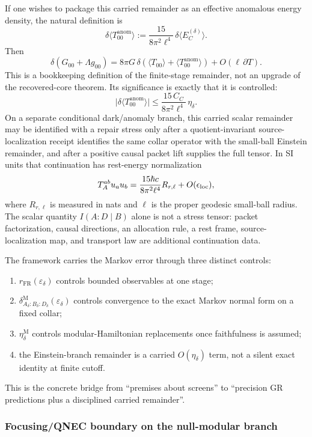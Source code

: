If one wishes to package this carried remainder as an effective anomalous energy density, the natural definition is
\[
\delta\langle T_{00}^{\mathrm{anom}}\rangle
:=
\frac{15}{8\pi^2\ell^4}\,
\delta\langle E_C^{(\delta)}\rangle.
\]
Then
\[
\delta\!\left(G_{00}+\Lambda g_{00}\right)
=
8\pi G\,
\delta\!\left(
\langle T_{00}\rangle
+
\langle T_{00}^{\mathrm{anom}}\rangle
\right)
+
O(\ell\,\partial T).
\]
This is a bookkeeping definition of the finite-stage remainder, not an upgrade of the recovered-core theorem. Its significance is exactly that it is controlled:
\[
\bigl|
\delta\langle T_{00}^{\mathrm{anom}}\rangle
\bigr|
\le
\frac{15\,C_C}{8\pi^2\ell^4}\,
\eta_\delta.
\]
On a separate conditional dark/anomaly branch, this carried scalar remainder
may be identified with a repair stress only after a quotient-invariant
source-localization receipt identifies the same collar operator with the
small-ball Einstein remainder, and after a positive causal packet lift supplies
the full tensor. In SI units that continuation has rest-energy normalization
\[
T_A^{ab}u_a u_b
=
\frac{15\hbar c}{8\pi^2\ell^4}R_{r,\ell}
+O(\epsilon_{\rm loc}),
\]
where \(R_{r,\ell}\) is measured in nats and \(\ell\) is the proper geodesic
small-ball radius. The scalar quantity \(I(A:D\mid B)\) alone is not a stress
tensor: packet factorization, causal directions, an allocation rule, a rest
frame, source-localization map, and transport law are additional continuation
data.

The framework carries the Markov error through three distinct controls:
\begin{enumerate}
\def\labelenumi{\arabic{enumi}.}
\tightlist
\item
\(r_{\mathrm{FR}}(\varepsilon_\delta)\) controls bounded observables at one stage;
\item
\(\delta^{\mathrm M}_{A_\delta:B_\delta:D_\delta}(\varepsilon_\delta)\) controls convergence to the exact Markov normal form on a fixed collar;
\item
\(\eta_\delta^{\mathrm M}\) controls modular-Hamiltonian replacements once faithfulness is assumed;
\item
the Einstein-branch remainder is a carried \(O(\eta_\delta)\) term, not a silent exact identity at finite cutoff.
\end{enumerate}

This is the concrete bridge from ``premises about screens'' to ``precision GR predictions plus a disciplined carried remainder''.

\subsubsection{Focusing/QNEC boundary on the null-modular branch}\label{510-focusingqnec-internalization-via-relative-entropy}

